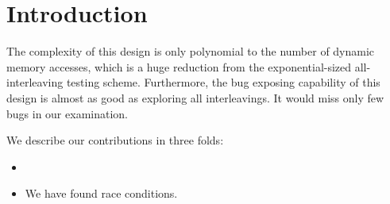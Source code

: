 \section{Introduction}
\label{s:intro}


%
The complexity of this design is only polynomial to the number of
dynamic memory accesses, which is a huge reduction from the
exponential-sized all-interleaving testing scheme.  Furthermore, the
bug exposing capability of this design is almost as good as exploring
all interleavings. It would miss only few bugs in our examination.

We describe our contributions in three folds:

\begin{itemize}
  \item 
  \item We have found \totalbugs race conditions.
\end{itemize}

